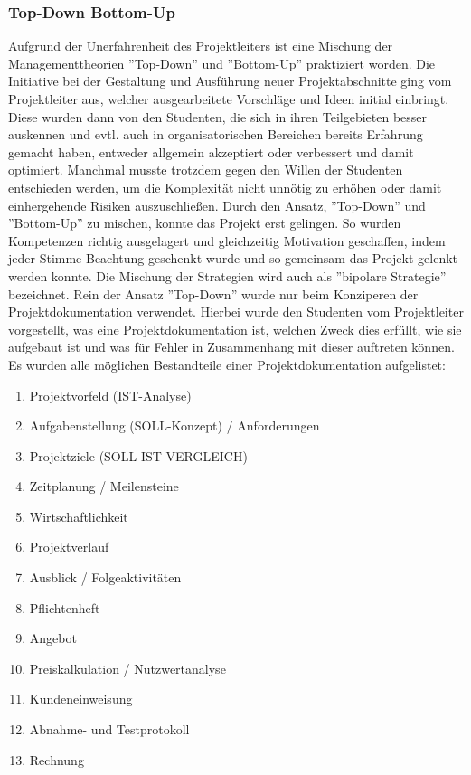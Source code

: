 \subsubsection{Top-Down Bottom-Up}
Aufgrund der Unerfahrenheit des Projektleiters ist eine Mischung der Managementtheorien ”Top-Down” und ”Bottom-Up” praktiziert worden. Die Initiative bei der Gestaltung und Ausführung neuer Projektabschnitte ging vom Projektleiter aus, welcher ausgearbeitete Vorschläge und Ideen initial einbringt. Diese wurden dann von den Studenten, die sich in ihren Teilgebieten besser auskennen und evtl. auch in organisatorischen Bereichen bereits Erfahrung gemacht haben, entweder allgemein akzeptiert oder verbessert und damit optimiert. Manchmal musste trotzdem gegen den Willen der Studenten entschieden werden, um die Komplexität nicht unnötig zu erhöhen oder damit einhergehende Risiken auszuschließen. Durch den Ansatz, ”Top-Down” und ”Bottom-Up” zu mischen, konnte das Projekt erst gelingen. So wurden Kompetenzen richtig ausgelagert und gleichzeitig Motivation geschaffen, indem jeder Stimme Beachtung geschenkt wurde und so gemeinsam das Projekt gelenkt werden konnte. Die Mischung der Strategien wird auch als ”bipolare Strategie” bezeichnet. \cite{top_down-bottom_up}\newline
Rein der Ansatz ”Top-Down” wurde nur beim Konziperen der Projektdokumentation verwendet. Hierbei wurde den Studenten vom Projektleiter vorgestellt, was eine Projektdokumentation ist, welchen Zweck dies erfüllt, wie sie aufgebaut ist und was für Fehler in Zusammenhang mit dieser auftreten können.\\ Es wurden alle möglichen Bestandteile einer Projektdokumentation aufgelistet:
\begin{enumerate}
    \item Projektvorfeld (IST-Analyse)
    \item Aufgabenstellung (SOLL-Konzept) / Anforderungen
    \item Projektziele (SOLL-IST-VERGLEICH)
    \item Zeitplanung / Meilensteine
    \item Wirtschaftlichkeit
    \item Projektverlauf
    \item Ausblick / Folgeaktivitäten
    \item Pflichtenheft
    \item Angebot
    \item Preiskalkulation / Nutzwertanalyse
    \item Kundeneinweisung
    \item Abnahme- und Testprotokoll
    \item Rechnung
\end{enumerate}
